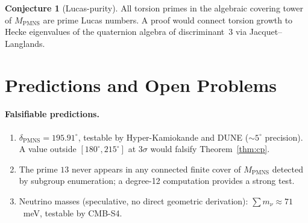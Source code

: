 \documentclass[11pt,a4paper]{article}
\theoremstyle{definition}
\newtheorem{conjecture}[theorem]{Conjecture}
\theoremstyle{remark}
\newcommand{\MPMNS}{M_{\mathrm{PMNS}}}
\begin{document}
\begin{conjecture}[Lucas-purity]
\label{conj:lucas}
All torsion primes in the algebraic covering tower of $\MPMNS$
are prime Lucas numbers.
A proof would connect torsion growth to Hecke eigenvalues of
the quaternion algebra of discriminant~3 via Jacquet--Langlands.
\end{conjecture}

\section{Predictions and Open Problems}
\label{sec:predictions}

\paragraph{Falsifiable predictions.}
\begin{enumerate}[(1)]
\item $\delta_{\mathrm{PMNS}} = 195.91^\circ$,
  testable by Hyper-Kamiokande and DUNE ($\sim5^\circ$ precision).
  A value outside $[180^\circ,215^\circ]$ at $3\sigma$
  would falsify Theorem~\ref{thm:cp}.
\item The prime $13$ never appears in any connected finite
  cover of $\MPMNS$ detected by subgroup enumeration;
  a degree-12 computation provides a strong test.
\item Neutrino masses (speculative, no direct geometric derivation):
  $\sum m_\nu\approx71$~meV, testable by CMB-S4.
\end{enumerate}
\end{document}
